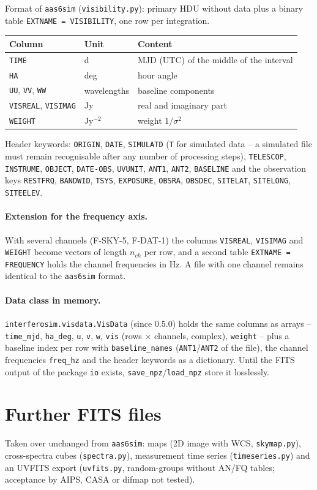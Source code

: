 Format of \texttt{aas6sim} (\texttt{visibility.py}): primary HDU without
data plus a binary table \texttt{EXTNAME = VISIBILITY}, one row per
integration.
\begin{center}
\begin{tabular}{@{}lll@{}}
\toprule
Column & Unit & Content \\
\midrule
\texttt{TIME} & d & MJD (UTC) of the middle of the interval \\
\texttt{HA} & deg & hour angle \\
\texttt{UU}, \texttt{VV}, \texttt{WW} & wavelengths & baseline components \\
\texttt{VISREAL}, \texttt{VISIMAG} & Jy & real and imaginary part \\
\texttt{WEIGHT} & Jy$^{-2}$ & weight $1/\sigma^2$ \\
\bottomrule
\end{tabular}
\end{center}
Header keywords: \texttt{ORIGIN}, \texttt{DATE}, \texttt{SIMULATD}
(\texttt{T} for simulated data -- a simulated file must remain
recognisable after any number of processing steps), \texttt{TELESCOP},
\texttt{INSTRUME}, \texttt{OBJECT}, \texttt{DATE-OBS}, \texttt{UVUNIT},
\texttt{ANT1}, \texttt{ANT2}, \texttt{BASELINE} and the observation keys
\texttt{RESTFRQ}, \texttt{BANDWID}, \texttt{TSYS}, \texttt{EXPOSURE},
\texttt{OBSRA}, \texttt{OBSDEC}, \texttt{SITELAT}, \texttt{SITELONG},
\texttt{SITEELEV}.

\paragraph*{Extension for the frequency axis.} With several channels
(F-SKY-5, F-DAT-1) the columns \texttt{VISREAL}, \texttt{VISIMAG} and
\texttt{WEIGHT} become vectors of length $n_{ch}$ per row, and a
second table \texttt{EXTNAME = FREQUENCY} holds the channel
frequencies in Hz. A file with one channel remains identical to the
\texttt{aas6sim} format.

\paragraph*{Data class in memory.} \texttt{interferosim.visdata.VisData}
(since 0.5.0) holds the same columns as arrays -- \texttt{time\_mjd},
\texttt{ha\_deg}, \texttt{u}, \texttt{v}, \texttt{w}, \texttt{vis} (rows
$\times$ channels, complex), \texttt{weight} -- plus a baseline index per row
with \texttt{baseline\_names} (\texttt{ANT1}/\texttt{ANT2} of the file), the
channel frequencies \texttt{freq\_hz} and the header keywords as a
dictionary. Until the FITS output of the package \texttt{io} exists,
\texttt{save\_npz}/\texttt{load\_npz} store it losslessly.

\section{Further FITS files}

Taken over unchanged from \texttt{aas6sim}: maps (2D image with WCS,
\texttt{skymap.py}), cross-spectra cubes (\texttt{spectra.py}),
measurement time series (\texttt{timeseries.py}) and an UVFITS export
(\texttt{uvfits.py}, random-groups without AN/FQ tables; acceptance by
AIPS, CASA or difmap not tested).
